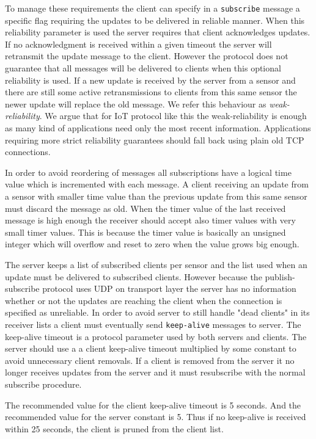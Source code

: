 To manage these requirements the client can specify in a \texttt{subscribe}
message a specific flag requiring the updates to be delivered in reliable
manner. When this reliability parameter is used the server requires that client
acknowledges updates. If no acknowledgment is received within a given
timeout the server will retransmit the update message to the client. However the
protocol does not guarantee that all messages will be delivered to clients when this
optional reliability is used. If a new update is received by the server from a
sensor and there are still some active retransmissions to clients from this same
sensor the newer update will replace the old message. We refer this behaviour as
\textit{weak-reliability}. We argue that for IoT protocol like this the
weak-reliability is enough as many kind of applications need only the most
recent information. Applications requiring more strict reliability guarantees
should fall back using plain old TCP connections. 


In order to avoid reordering of messages all subscriptions have a logical time value which
is incremented with each message. A client receiving an update from a sensor
with smaller time value than the previous update from this same sensor must
discard the message as old. When the timer value of the last received message is
high enough the receiver should accept also timer values with very small timer
values. This is because the timer value is basically an unsigned integer which
will overflow and reset to zero when the value grows big enough.

The server keeps a list of subscribed clients per sensor and the list used when an
update must be delivered to subscribed clients. However because the publish-subscribe
protocol uses UDP on transport layer the server has no information whether or not
the updates are reaching the client when the connection is specified as unreliable.
In order to avoid server to still handle "dead clients" in its receiver lists a client
must eventually send \texttt{keep-alive} messages to server. The keep-alive timeout
is a protocol parameter used by both servers and clients. The server should use a
a client keep-alive timeout multiplied by some constant to avoid unnecessary client removals.
If a client is removed from the server it no longer receives updates from the server and it must
resubscribe with the normal subscribe procedure.

The recommended value for the client keep-alive timeout is 5 seconds. And the
recommended value for the server constant is 5. Thus if no keep-alive is
received within 25 seconds, the client is pruned from the client list.



